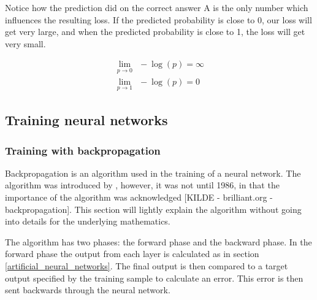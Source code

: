 Notice how the prediction did on the correct answer A is the only number which influences the resulting loss. If the predicted probability is close to 0, our loss will get very large, and when the predicted probability is close to 1, the loss will get very small.

\begin{equation}
    \begin{split}
            \lim_{p \rightarrow 0}\ \ -\log(p) = \infty \\
            \lim_{p \rightarrow 1}\ \ -\log(p) = 0
    \end{split}
\end{equation}

\subsection{Training neural networks}

\subsubsection{Training with backpropagation}
\label{training_with_backpropagation}

Backpropagation is an algorithm used in the training of a neural network. The algorithm was introduced by \cite{werbos_beyond_1974}, however, it was not until 1986, in \cite{rumelhart_learning_1986} that the importance of the algorithm was acknowledged [KILDE - brilliant.org - backpropagation]. This section will lightly explain the algorithm without going into details for the underlying mathematics. 

The algorithm has two phases: the forward phase and the backward phase. In the forward phase the output from each layer is calculated as in section \ref{artificial_neural_networks}. The final output is then compared to a target output specified by the training sample to calculate an error. This error is then sent backwards through the neural network. %

